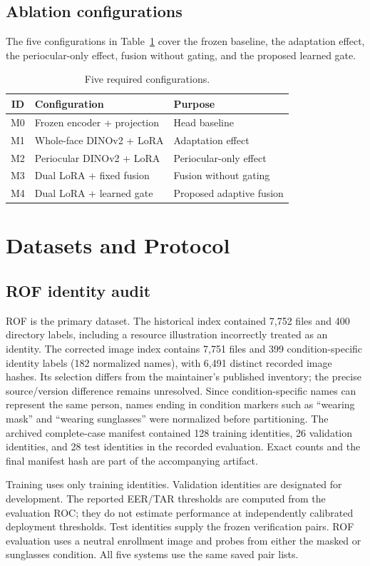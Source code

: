 \documentclass[10pt,journal,compsoc]{IEEEtran}
\begin{document}
\subsection{Ablation configurations}
The five configurations in Table~\ref{tab:ablations} cover the frozen baseline, the adaptation effect, the periocular-only effect, fusion without gating, and the proposed learned gate.
\begin{table}[t]
\centering
\caption{Five required configurations.}
\label{tab:ablations}
\begin{tabular}{cll}
\toprule
ID & Configuration & Purpose\\
\midrule
M0 & Frozen encoder + projection & Head baseline\\
M1 & Whole-face DINOv2 + LoRA & Adaptation effect\\
M2 & Periocular DINOv2 + LoRA & Periocular-only effect\\
M3 & Dual LoRA + fixed fusion & Fusion without gating\\
M4 & Dual LoRA + learned gate & Proposed adaptive fusion\\
\bottomrule
\end{tabular}
\end{table}

\section{Datasets and Protocol}
\subsection{ROF identity audit}
ROF is the primary dataset. The historical index contained 7,752 files and 400 directory labels, including a resource illustration incorrectly treated as an identity. The corrected image index contains 7,751 files and 399 condition-specific identity labels (182 normalized names), with 6,491 distinct recorded image hashes. Its selection differs from the maintainer's published inventory; the precise source/version difference remains unresolved. Since condition-specific names can represent the same person, names ending in condition markers such as ``wearing mask'' and ``wearing sunglasses'' were normalized before partitioning. The archived complete-case manifest contained 128 training identities, 26 validation identities, and 28 test identities in the recorded evaluation. Exact counts and the final manifest hash are part of the accompanying artifact.

Training uses only training identities. Validation identities are designated for development. The reported EER/TAR thresholds are computed from the evaluation ROC; they do not estimate performance at independently calibrated deployment thresholds. Test identities supply the frozen verification pairs. ROF evaluation uses a neutral enrollment image and probes from either the masked or sunglasses condition. All five systems use the same saved pair lists.
\end{document}
